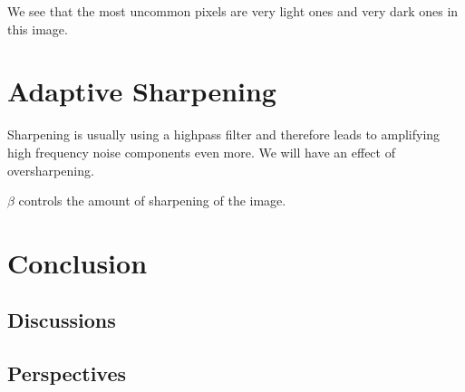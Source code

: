 We see that the most uncommon pixels are very light ones and very dark ones in this image.

\section{Adaptive Sharpening}

Sharpening is usually using a highpass filter and therefore leads to amplifying high frequency noise components even more.
We will have an effect of oversharpening.

\(\beta \) controls the amount of sharpening of the image.


\section{Conclusion}

\subsection{Discussions}

\subsection{Perspectives}
